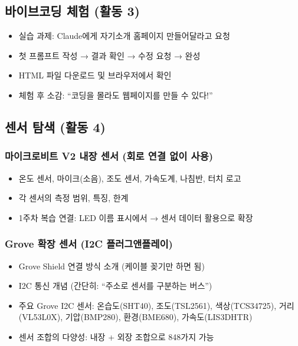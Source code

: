 \documentclass[11pt, a4paper]{article}
\begin{document}
\subsection{바이브코딩 체험 (활동 3)}

\begin{itemize}[leftmargin=1.5em]
\item 실습 과제: Claude에게 자기소개 홈페이지 만들어달라고 요청
\item 첫 프롬프트 작성 → 결과 확인 → 수정 요청 → 완성
\item HTML 파일 다운로드 및 브라우저에서 확인
\item 체험 후 소감: ``코딩을 몰라도 웹페이지를 만들 수 있다!''
\end{itemize}

\subsection{센서 탐색 (활동 4)}

\subsubsection{마이크로비트 V2 내장 센서 (회로 연결 없이 사용)}

\begin{itemize}[leftmargin=1.5em]
\item 온도 센서, 마이크(소음), 조도 센서, 가속도계, 나침반, 터치 로고
\item 각 센서의 측정 범위, 특징, 한계
\item 1주차 복습 연결: LED 이름 표시에서 → 센서 데이터 활용으로 확장
\end{itemize}

\subsubsection{Grove 확장 센서 (I2C 플러그앤플레이)}

\begin{itemize}[leftmargin=1.5em]
\item Grove Shield 연결 방식 소개 (케이블 꽂기만 하면 됨)
\item I2C 통신 개념 (간단히: ``주소로 센서를 구분하는 버스'')
\item 주요 Grove I2C 센서: 온습도(SHT40), 조도(TSL2561), 색상(TCS34725), 거리(VL53L0X), 기압(BMP280), 환경(BME680), 가속도(LIS3DHTR)
\item 센서 조합의 다양성: 내장 + 외장 조합으로 848가지 가능
\end{itemize}
\end{document}
